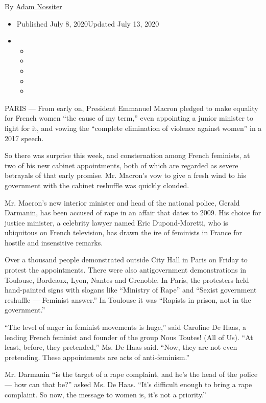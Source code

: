 By \href{https://www.nytimes3xbfgragh.onion/by/adam-nossiter}{Adam
Nossiter}

\begin{itemize}
\item
  Published July 8, 2020Updated July 13, 2020
\item
  \begin{itemize}
  \item
  \item
  \item
  \item
  \item
  \end{itemize}
\end{itemize}

PARIS --- From early on, President Emmanuel Macron pledged to make
equality for French women ``the cause of my term,'' even appointing a
junior minister to fight for it, and vowing the ``complete elimination
of violence against women'' in a 2017 speech.

So there was surprise this week, and consternation among French
feminists, at two of his new cabinet appointments, both of which are
regarded as severe betrayals of that early promise. Mr. Macron's vow to
give a fresh wind to his government with the cabinet reshuffle was
quickly clouded.

Mr. Macron's new interior minister and head of the national police,
Gerald Darmanin, has been accused of rape in an affair that dates to
2009. His choice for justice minister, a celebrity lawyer named Eric
Dupond-Moretti, who is ubiquitous on French television, has drawn the
ire of feminists in France for hostile and insensitive remarks.

Over a thousand people demonstrated outside City Hall in Paris on Friday
to protest the appointments. There were also antigovernment
demonstrations in Toulouse, Bordeaux, Lyon, Nantes and Grenoble. In
Paris, the protesters held hand-painted signs with slogans like
``Ministry of Rape'' and ``Sexist government reshuffle --- Feminist
answer.'' In Toulouse it was ``Rapists in prison, not in the
government.''

``The level of anger in feminist movements is huge,'' said Caroline De
Haas, a leading French feminist and founder of the group Nous Toutes!
(All of Us). ``At least, before, they pretended,'' Ms. De Haas said.
``Now, they are not even pretending. These appointments are acts of
anti-feminism.''

Mr. Darmanin ``is the target of a rape complaint, and he's the head of
the police --- how can that be?'' asked Ms. De Haas. ``It's difficult
enough to bring a rape complaint. So now, the message to women is, it's
not a priority.''


